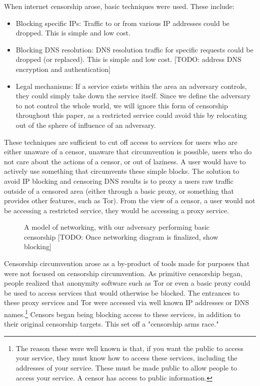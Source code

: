 \documentclass[12pt]{report}
\begin{document}
When internet censorship arose, basic techniques were used. These include:
\begin{itemize}
  \item Blocking specific IPs: Traffic to or from various IP addresses could be dropped. This is simple and low cost.
  \item Blocking DNS resolution: DNS resolution traffic for specific requests could be dropped (or replaced). This is simple and low cost. [TODO: address DNS encryption and authentication]
  \item Legal mechanisms: If a service exists within the area an adversary controls, they could simply take down the service itself. Since we define the adversary to not control the whole world, we will ignore this form of censorship throughout this paper, as a restricted service could avoid this by relocating out of the sphere of influence of an adversary.
\end{itemize}
These techniques are sufficient to cut off access to services for users who are either unaware of a censor, unaware that circumvention is possible, users who do not care about the actions of a censor, or out of laziness. A user would have to actively use something that circumvents these simple blocks. The solution to avoid IP blocking and censoring DNS results is to proxy a users raw traffic outside of a censored area (either through a basic proxy, or something that provides other features, such as Tor). From the view of a censor, a user would not be accessing a restricted service, they would be accessing a proxy service.

\begin{figure}
\begin{center}
{}
\end{center}
\caption[Basic networking, with an adversary performing censorship]{A model of networking, with our adversary performing basic censorship [TODO: Once networking diagram is finalized, show blocking]}
\end{figure}

Censorship circumvention arose as a by-product of tools made for purposes that were not focused on censorship circumvention. As primitive censorship began, people realized that anonymity software such as Tor or even a basic proxy could be used to access services that would otherwise be blocked. The entrances to these proxy services and Tor were accessed via well known IP addresses or DNS names.\footnote{The reason these were well known is that, if you want the public to access your service, they must know how to access these services, including the addresses of your service. These must be made public to allow people to access your service. A censor has access to public information.} Censors began being blocking access to these services, in addition to their original censorship targets. This set off a "censorship arms race."
\end{document}
